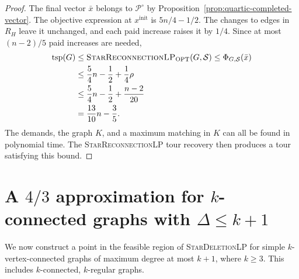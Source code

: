 \documentclass[11pt]{amsart}
\newcommand{\1}{\mathbbm{1}}
\newcommand{\LPone}{\textsc{StarDeletionLP}}
\newcommand{\LPtwo}{\textsc{StarReconnectionLP}}
\begin{document}
\begin{proof}
The final vector $\bar x$ belongs to ${\mathcal P^\circ}$ by
Proposition~\ref{prop:quartic-completed-vector}.
The objective expression at $x^{\mathrm{init}}$ is $5n/4-1/2$.
The changes to edges in $R_H$ leave it unchanged,
and each paid increase raises it by $1/4$.
Since at most $(n-2)/5$ paid increases are needed,
\[
 \begin{aligned}
 \operatorname{tsp}(G)
 &\le\text{\LPtwo}_{\mathrm{OPT}}(G,\mathcal S)
 \le\Phi_{G,\mathcal S}(\bar x)\\
 &\le\frac54n-\frac12+\frac14\rho\\
 &\le\frac54n-\frac12+\frac{n-2}{20}\\
 &=\frac{13}{10}n-\frac35.
 \end{aligned}
\]
The demands, the graph $K$, and a maximum matching in $K$
can all be found in polynomial time. The \LPtwo{} tour
recovery then produces a tour satisfying this bound.
\end{proof}




















\clearpage

\section{A \texorpdfstring{$4/3$}{4/3} approximation for \texorpdfstring{$k$}{k}-connected graphs with \texorpdfstring{$\Delta\le k+1$}{Delta at most k+1}}
\label{sec:k-connected-degree-bounded}

We now construct a point in the feasible region of \LPone{} for simple
$k$-vertex-connected graphs of maximum degree at most $k+1$,
where $k\ge3$. This includes $k$-connected, $k$-regular graphs.
\end{document}
